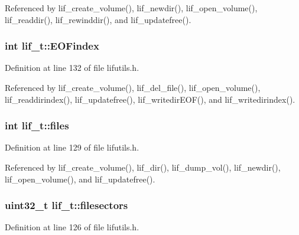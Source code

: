 Referenced by lif\+\_\+create\+\_\+volume(), lif\+\_\+newdir(), lif\+\_\+open\+\_\+volume(), lif\+\_\+readdir(), lif\+\_\+rewinddir(), and lif\+\_\+updatefree().

\subsubsection[{\texorpdfstring{E\+O\+Findex}{EOFindex}}]{\setlength{\rightskip}{0pt plus 5cm}int lif\+\_\+t\+::\+E\+O\+Findex}\hypertarget{structlif__t_a68c465a879c7d4bd2279682185b6250e}{}\label{structlif__t_a68c465a879c7d4bd2279682185b6250e}


Definition at line 132 of file lifutils.\+h.



Referenced by lif\+\_\+create\+\_\+volume(), lif\+\_\+del\+\_\+file(), lif\+\_\+open\+\_\+volume(), lif\+\_\+readdirindex(), lif\+\_\+updatefree(), lif\+\_\+writedir\+E\+O\+F(), and lif\+\_\+writedirindex().

\subsubsection[{\texorpdfstring{files}{files}}]{\setlength{\rightskip}{0pt plus 5cm}int lif\+\_\+t\+::files}\hypertarget{structlif__t_aceca398e2e3f6bcffe1593969544d546}{}\label{structlif__t_aceca398e2e3f6bcffe1593969544d546}


Definition at line 129 of file lifutils.\+h.



Referenced by lif\+\_\+create\+\_\+volume(), lif\+\_\+dir(), lif\+\_\+dump\+\_\+vol(), lif\+\_\+newdir(), lif\+\_\+open\+\_\+volume(), and lif\+\_\+updatefree().

\subsubsection[{\texorpdfstring{filesectors}{filesectors}}]{\setlength{\rightskip}{0pt plus 5cm}uint32\+\_\+t lif\+\_\+t\+::filesectors}\hypertarget{structlif__t_a1223702cce63f879654d51773243643d}{}\label{structlif__t_a1223702cce63f879654d51773243643d}


Definition at line 126 of file lifutils.\+h.



